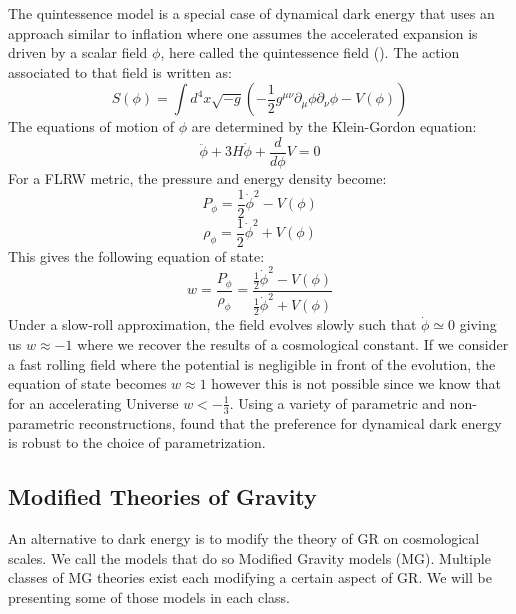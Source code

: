 The quintessence model is a special case of dynamical dark energy that uses an approach similar to inflation where one assumes the accelerated expansion is driven by a scalar field $\phi$, here called the quintessence field (\cite{Ratra_1988}). 
The action associated to that field is written as:
\begin{equation}
    S(\phi) = \int d^4x \sqrt{-g}\left( -\frac{1}{2} g^{\mu \nu} \partial_{\mu}\phi \partial_{\nu} \phi - V(\phi) \right)
\end{equation}
The equations of motion of $\phi$ are determined by the Klein-Gordon equation:
\begin{equation}
    \ddot{\phi} + 3H \dot{\phi} + \frac{d}{d\phi}V = 0
\end{equation}
For a FLRW metric, the pressure and energy density become:
\begin{equation}
    P_{\phi} = \frac{1}{2}\dot{\phi}^2 - V(\phi)
\end{equation}
\begin{equation}
    \rho_{\phi} = \frac{1}{2}\dot{\phi}^2 + V(\phi)
\end{equation}
This gives the following equation of state:
\begin{equation}
    w = \frac{P_{\phi}}{\rho_{\phi}} = \frac{\frac{1}{2}\dot{\phi}^2 - V(\phi)}{\frac{1}{2}\dot{\phi}^2 + V(\phi)}
\end{equation}
Under a slow-roll approximation, the field evolves slowly such that $\dot{\phi} \simeq 0$ giving us $w\approx -1$ where we recover the results 
of a cosmological constant. If we consider a fast rolling field where the potential is negligible in front of the evolution, the equation of state becomes $w\approx 1$ 
however this is not possible since we know that for an accelerating Universe $w<-\frac{1}{3}$. 
Using a variety of parametric and non-parametric reconstructions, \cite{Lodha_2025} found that the preference for dynamical dark energy is robust to the choice of parametrization. \\ 

\subsection{Modified Theories of Gravity} \label{sec:modified_gravity}
An alternative to dark energy is to modify the theory of GR on cosmological scales. We call the models that do so Modified Gravity models (MG). Multiple classes of MG theories 
exist each modifying a certain aspect of GR. We will be presenting some of those models in each class.\\

